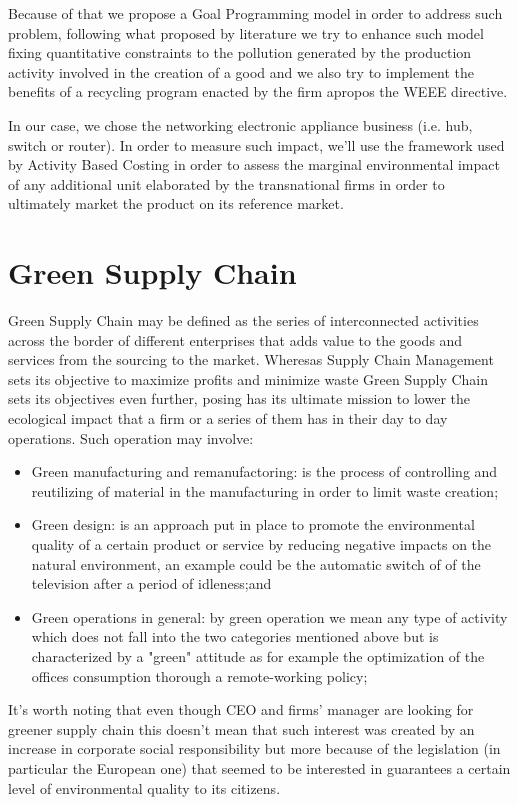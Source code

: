 \documentclass{article}
\begin{document}
Because of that we propose a Goal Programming model in order to address such problem, following what proposed by literature we try to enhance such model fixing quantitative constraints to the pollution generated by the production activity involved in the creation of a good and we also try to implement the benefits of a recycling program enacted by the firm apropos the WEEE directive.

In our case, we chose the networking electronic appliance business (i.e. hub, switch or router). In order to measure such impact, we'll use the framework used by Activity Based Costing in order to assess the marginal environmental impact of any additional unit elaborated by the transnational firms in order to ultimately market the product on its reference market.

\section{Green Supply Chain}
Green Supply Chain may be defined as the series of interconnected activities across the border of different enterprises that adds value to the goods and services from the sourcing to the market. Wheresas Supply Chain Management sets its objective to maximize profits and minimize waste Green Supply Chain sets its objectives even further, posing has its ultimate mission to lower the ecological impact that a firm or a series of them has in their day to day operations. Such operation may involve:
  \begin{itemize}
    \item Green manufacturing and remanufactoring: is the process of controlling and reutilizing of material in the manufacturing in order to limit waste creation\cite{urvashi_green_2013};
    \item Green design: is an approach put in place to promote the environmental quality of a certain product or service  by reducing negative impacts on the natural environment, an example could be the automatic switch of of the television after a period of idleness\cite{ceschin_evolution_2016};and
    \item Green operations in general: by green operation we mean any type of activity which does not fall into the two categories mentioned above but is characterized by a "green" attitude as for example the optimization of the offices consumption thorough a remote-working policy;
  \end{itemize}

It's worth noting that even though CEO and firms' manager are looking for greener supply chain this doesn't mean that such interest was created by an increase in corporate social responsibility but more because of the legislation (in particular the European one) that seemed to be interested in guarantees a certain level of environmental quality to its citizens.
\end{document}
